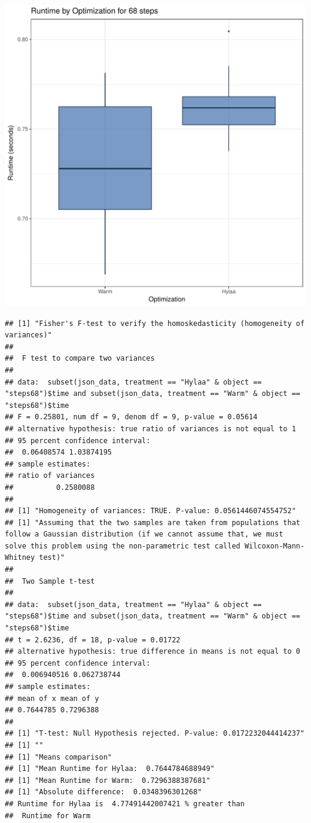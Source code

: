 \documentclass{article}\usepackage[]{graphicx}\usepackage[]{color}
\makeatletter
\def\maxwidth{ %
  \ifdim\Gin@nat@width>\linewidth
    \linewidth
  \else
    \Gin@nat@width
  \fi
}
\newenvironment{kframe}{%
 \def\at@end@of@kframe{}%
 \ifinner\ifhmode%
  \def\at@end@of@kframe{\end{minipage}}%
  \begin{minipage}{\columnwidth}%
 \fi\fi%
 \def\FrameCommand##1{\hskip\@totalleftmargin \hskip-\fboxsep
 \colorbox{shadecolor}{##1}\hskip-\fboxsep
     \hskip-\linewidth \hskip-\@totalleftmargin \hskip\columnwidth}%
 \MakeFramed {\advance\hsize-\width
   \@totalleftmargin\z@ \linewidth\hsize
   \@setminipage}}%
 {\par\unskip\endMakeFramed%
 \at@end@of@kframe}
\newenvironment{knitrout}{}{} %
\makeatother
\begin{document}
\begin{knitrout}
\color{fgcolor}
\includegraphics[width=\maxwidth]{figure/RH1_steps68-1} 
\begin{kframe}\begin{verbatim}
## [1] "Fisher's F-test to verify the homoskedasticity (homogeneity of variances)"
## 
## 	F test to compare two variances
## 
## data:  subset(json_data, treatment == "Hylaa" & object == "steps68")$time and subset(json_data, treatment == "Warm" & object == "steps68")$time
## F = 0.25801, num df = 9, denom df = 9, p-value = 0.05614
## alternative hypothesis: true ratio of variances is not equal to 1
## 95 percent confidence interval:
##  0.06408574 1.03874195
## sample estimates:
## ratio of variances 
##          0.2580088 
## 
## [1] "Homogeneity of variances: TRUE. P-value: 0.0561446074554752"
## [1] "Assuming that the two samples are taken from populations that follow a Gaussian distribution (if we cannot assume that, we must solve this problem using the non-parametric test called Wilcoxon-Mann-Whitney test)"
## 
## 	Two Sample t-test
## 
## data:  subset(json_data, treatment == "Hylaa" & object == "steps68")$time and subset(json_data, treatment == "Warm" & object == "steps68")$time
## t = 2.6236, df = 18, p-value = 0.01722
## alternative hypothesis: true difference in means is not equal to 0
## 95 percent confidence interval:
##  0.006940516 0.062738744
## sample estimates:
## mean of x mean of y 
## 0.7644785 0.7296388 
## 
## [1] "T-test: Null Hypothesis rejected. P-value: 0.0172232044414237"
## [1] ""
## [1] "Means comparison"
## [1] "Mean Runtime for Hylaa:  0.7644784688949"
## [1] "Mean Runtime for Warm:  0.7296388387681"
## [1] "Absolute difference:  0.0348396301268"
## Runtime for Hylaa is  4.77491442007421 % greater than 
##  Runtime for Warm
\end{verbatim}
\end{kframe}
\end{knitrout}
\end{document}
